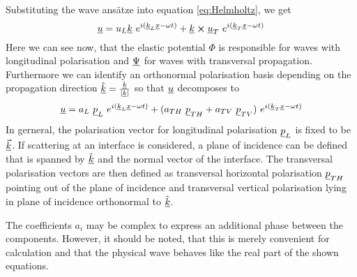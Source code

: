 Substituting the wave ansätze into equation \ref{eq:Helmholtz}, we get
\begin{equation}
    \uline{u} = u_L \uline{k}\	e^{i(\uline{k}_L\uline{x}-\omega t)}
    + \uline{k} \cross \uline{u}_T\ e^{i(\uline{k}_T\uline{x}-\omega t)}
\end{equation}
Here we can see now, that the elastic potential $\Phi$ is responsible for waves
with longitudinal polarisation and $\underline{\Psi}$ for waves with transversal
propagation. Furthermore we can identify an orthonormal polarisation basis
depending on the propagation direction $\underline{\hat{k}} =
    \frac{\underline{k}}{|\underline{k}|}$ so that $\underline{u}$ decomposes to
\begin{equation}
    \uline{u} = a_L \ \uline{p}_L\	e^{i(\uline{k}_L\uline{x}-\omega
            t)}
    + (a_{TH}\ \uline{p}_{TH} + a_{TV}\ \uline{p}_{TV})\
    e^{i(\uline{k}_T\uline{x}-\omega t)}
\end{equation}
In gerneral, the polarisation vector for longitudinal polarisation
$\underline{p}_L$ is fixed to be $\underline{\vec{k}}$. If scattering at an interface
is considered, a plane of incidence can be defined that is spanned by
$\underline{\hat{k}}$ and the normal vector of the interface. The transversal
polarisation vectors are then defined as transversal horizontal polarisation
$\underline{p}_{TH}$ pointing out of the plane of incidence and transversal
vertical polarisation lying in plane of incidence orthonormal to
$\underline{\hat{k}}$.

The coefficients $a_i$ may be complex to express an additional phase between
the components. However, it should be noted, that this is merely convenient for
calculation and that the physical wave behaves like the real part of the shown
equations.


